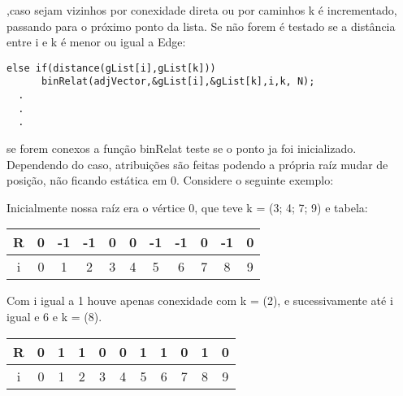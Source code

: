 \documentclass[a4paper,11pt]{article}
\begin{document}
,caso sejam vizinhos por conexidade direta ou por caminhos k é incrementado, passando para o próximo ponto da lista. Se não forem é testado se a distância entre i e k é menor ou igual a Edge:

 \begin{lstlisting}[frame=single]
    else if(distance(gList[i],gList[k]))
      binRelat(adjVector,&gList[i],&gList[k],i,k, N);
  .
  .
  .
\end{lstlisting}

se forem conexos a função binRelat teste se o ponto ja foi inicializado. Dependendo do caso, atribuições são feitas podendo a própria raíz mudar de posição, não ficando estática em 0. Considere o seguinte exemplo:

\begin{center}
\end{center}

Inicialmente nossa raíz era o vértice 0, que teve k = (3; 4; 7; 9) e tabela:

\begin{table}[ht]
\centering
\begin{tabular}{c |c | c |c |c |c |c |c |c |c |c }
R & 0 & -1 & -1 & 0 & 0 & -1 & -1 & 0 & -1 & 0\\ \hline \hline
i & 0 & 1 & 2 & 3 & 4 & 5 & 6 & 7 & 8 & 9 
\end{tabular}
\end{table}

Com i igual a 1 houve apenas conexidade com k = (2), e sucessivamente até i igual e 6 e k = (8).

\begin{table}[ht]
\centering
\begin{tabular}{c |c | c |c |c |c |c |c |c |c |c }
R & 0 & 1 & 1 & 0 & 0 & 1 & 1 & 0 & 1 & 0\\ \hline \hline
i & 0 & 1 & 2 & 3 & 4 & 5 & 6 & 7 & 8 & 9 
\end{tabular}
\end{table}
\end{document}
